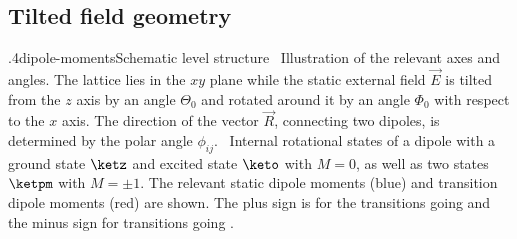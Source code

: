 \subsection{Tilted field geometry}
{.4}{dipole-moments}{Schematic level structure}
{\sfA~Illustration of the relevant axes and angles. The lattice lies in the $xy$ plane while the static external field $\vec{E}$ is tilted from the $z$ axis by an angle $\Theta_0$ and rotated around it by an angle $\Phi_0$ with respect to the $x$ axis. The direction of the vector $\vec{R}$, connecting two dipoles, is determined by the polar angle $\phi_{ij}$.
\sfB~Internal rotational states of a dipole with a ground state $\ketz$ and excited state $\keto$ with $M=0$, as well as two states $\ketpm$ with $M=\pm 1$. The relevant static dipole moments (blue) and transition dipole moments (red) are shown. The plus sign is for the transitions going  and the minus sign for transitions going .}


